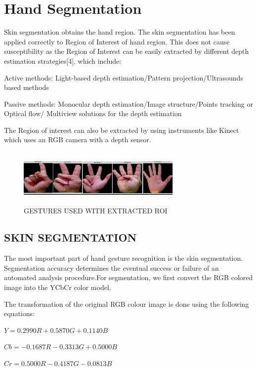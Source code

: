 \documentclass[conference]{IEEEtran}
\begin{document}


\section{Hand Segmentation}

Skin segmentation obtains the hand region. The skin segmentation has been applied correctly to Region of Interest of hand region. This does not cause susceptibility as the Region of Interest can be easily extracted by different depth estimation strategies[4], which include:

Active methods:
Light-based depth estimation/Pattern projection/Ultrasounds based methods

Passive methods:
Monocular depth estimation/Image structure/Points tracking or Optical flow/ Multiview solutions for the depth estimation

The Region of interest can also be extracted by using instruments like Kinect which uses an RGB camera with a depth sensor.

\begin{figure}[h!]
	\centering
	\includegraphics[width = 8cm, height = 2.8cm]{StandardDataset}
	\caption{GESTURES USED WITH EXTRACTED ROI}
\end{figure}

\subsection{SKIN SEGMENTATION}

The most important part of hand gesture recognition is the skin segmentation. Segmentation accuracy determines the eventual success or failure of an automated analysis procedure.For segmentation, we first convert the RGB colored image into the YCbCr color model.

The transformation of the original RGB colour image is done using
the following equations:

$Y = 0.2990R + 0.5870G + 0.1140B$

$Cb = -0.1687R - 0.3313G + 0.5000B$

$Cr = 0.5000R - 0.4187G - 0.0813B$
\end{document}
